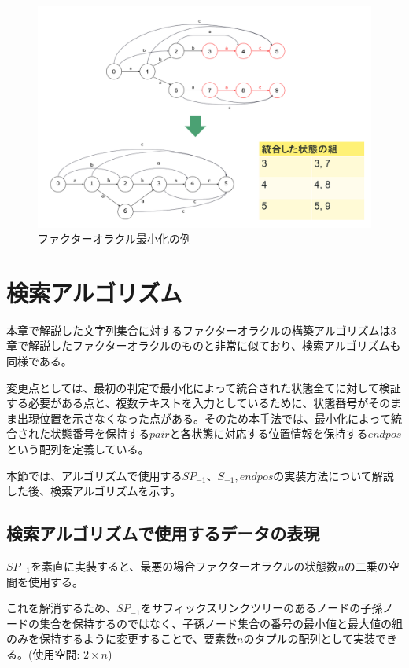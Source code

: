 \documentclass[11pt,a4paper]{jreport}
\begin{document}
  \begin{figure}[htbp]
    \centering
    \includegraphics[width=15cm]{pair.png}

    \caption{ファクターオラクル最小化の例}
  \end{figure}
  
  \section{検索アルゴリズム}

  本章で解説した文字列集合に対するファクターオラクルの構築アルゴリズムは3章で解説したファクターオラクルのものと非常に似ており、検索アルゴリズムも同様である。

  変更点としては、最初の判定で最小化によって統合された状態全てに対して検証する必要がある点と、複数テキストを入力としているために、状態番号がそのまま出現位置を示さなくなった点がある。そのため本手法では、最小化によって統合された状態番号を保持する$pair$と各状態に対応する位置情報を保持する$endpos$という配列を定義している。
  
  本節では、アルゴリズムで使用する$SP_{-1}、S_{-1}, endpos$の実装方法について解説した後、検索アルゴリズムを示す。

  \subsection{検索アルゴリズムで使用するデータの表現}

  $SP_{-1}$を素直に実装すると、最悪の場合ファクターオラクルの状態数$n$の二乗の空間を使用する。

  これを解消するため、$SP_{-1}$をサフィックスリンクツリーのあるノードの子孫ノードの集合を保持するのではなく、子孫ノード集合の番号の最小値と最大値の組のみを保持するように変更することで、要素数$n$のタプルの配列として実装できる。(使用空間: $2 \times n$)
  
\end{document}
